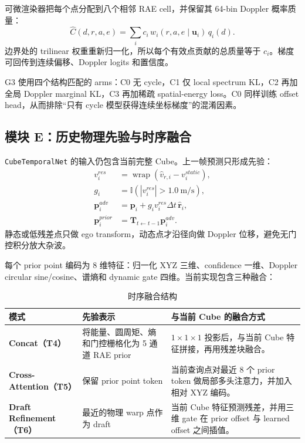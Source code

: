 \documentclass[11pt,a4paper,fontset=none]{ctexart}
\newcommand{\code}[1]{\texttt{#1}}
\begin{document}
可微渲染器把每个点分配到八个相邻 RAE cell，并保留其 64-bin Doppler 概率质量：
\begin{equation}
  \widehat C(d,r,a,e)=\sum_i c_i\,w_i(r,a,e\mid\mathbf u_i)\,q_i(d).
\end{equation}
边界处的 trilinear 权重重新归一化，所以每个有效点贡献的总质量等于 $c_i$。梯度可回传到连续偏移、Doppler logits 和置信度。

G3 使用四个结构匹配的 arms：C0 无 cycle，C1 仅 local spectrum KL，C2 再加全局 Doppler marginal KL，C3 再加稀疏 spatial-energy loss。C0 同样训练 offset head，从而排除“只有 cycle 模型获得连续坐标梯度”的混淆因素。

\subsection{模块 E：历史物理先验与时序融合}

\code{CubeTemporalNet} 的输入仍包含当前完整 Cube。上一帧预测只形成先验：
\begin{align}
  v_i^{res} &= \operatorname{wrap}(\hat v_{r,i}-v_{i}^{static}),\\
  g_i &= \mathbb{I}(|v_i^{res}|>1.0\ \mathrm{m/s}),\\
  \mathbf p_i^{adv} &= \mathbf p_i + g_i v_i^{res}\Delta t\,\hat{\mathbf r}_i,\\
  \mathbf p_i^{prior} &= \mathbf T_{t\leftarrow t-1}\mathbf p_i^{adv}.
\end{align}
静态或低残差点只做 ego transform，动态点才沿径向做 Doppler 位移，避免无门控积分放大杂波。

每个 prior point 编码为 8 维特征：归一化 XYZ 三维、confidence 一维、Doppler circular sine/cosine、谱熵和 dynamic gate 四维。当前实现包含三种融合：
\begin{table}[H]
\centering
\caption{时序融合结构}
\begin{tabularx}{\textwidth}{>{\bfseries}l X X}
\toprule
模式 & 先验表示 & 与当前 Cube 的融合方式 \\
\midrule
Concat（T4） & 将能量、圆周矩、熵和门控栅格化为 5 通道 RAE prior & $1\times1\times1$ 投影后，与当前 Cube 特征拼接，再用残差块融合。\\
Cross-Attention（T5） & 保留 prior point token & 当前查询点对最近 8 个 prior token 做局部多头注意力，并加入相对 XYZ 编码。\\
Draft Refinement（T6） & 最近的物理 warp 点作为 draft & 当前 Cube 特征预测残差，并用三维 gate 在 prior offset 与 learned offset 之间插值。\\
\bottomrule
\end{tabularx}
\end{table}
\end{document}
